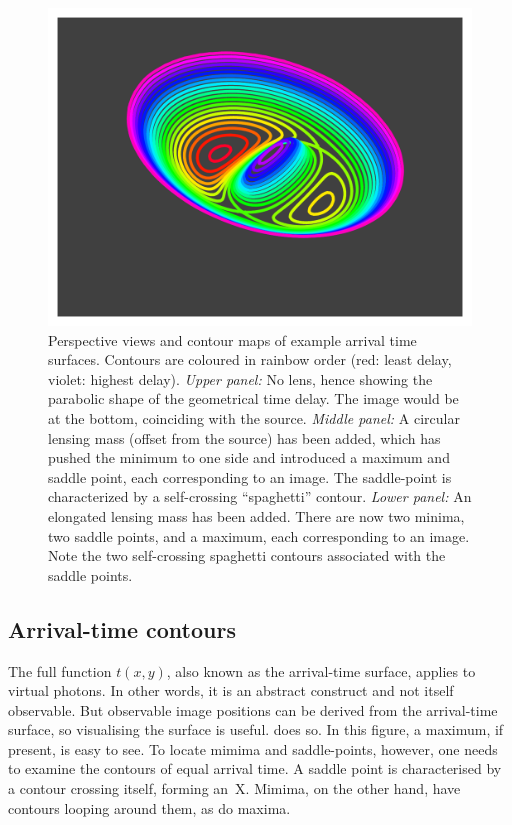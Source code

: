 \begin{figure}
\includegraphics[width=\columnwidth]{fig/arriv_2}
\caption{Perspective views and contour maps of example arrival time
  surfaces.  Contours are coloured in rainbow order (red: least delay,
  violet: highest delay).  {\em Upper panel:\/} No lens, hence showing
  the parabolic shape of the geometrical time delay.  The image would
  be at the bottom, coinciding with the source. {\em Middle panel:\/}
  A circular lensing mass (offset from the source) has been added,
  which has pushed the minimum to one side and introduced a maximum
  and saddle point, each corresponding to an image.  The saddle-point
  is characterized by a self-crossing ``spaghetti'' contour. {\em
    Lower panel:\/} An elongated lensing mass has been added.  There
  are now two minima, two saddle points, and a maximum, each
  corresponding to an image.  Note the two self-crossing spaghetti
  contours associated with the saddle points.}
\label{fig:arriv}
\end{figure}

\subsection{Arrival-time contours} \label{sec:arriv}

The full function $t(x,y)$, also known as the arrival-time surface,
applies to virtual photons.  In other words, it is an abstract
construct and not itself observable.  But observable image positions
can be derived from the arrival-time surface, so visualising the
surface is useful.   does so.  In this figure, a
maximum, if present, is easy to see.  To locate mimima and
saddle-points, however, one needs to examine the contours of equal
arrival time.  A saddle point is characterised by a contour crossing
itself, forming an~X.  Mimima, on the other hand, have contours
looping around them, as do maxima.

